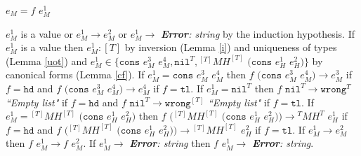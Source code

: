 \begin{case}

$e_{M}=f$ $e_{M}^{1}$

$e_{M}^{1}$ is a value or $e_{M}^{1}\rightarrow e_{M}^{2}$ or $e_{M}^{1}\rightarrow$ \emph{\textbf{Error}: string} by the induction hypothesis.  If $e_{M}^{1}$ is a value then $e_{M}^{1}:[T]$ by inversion (Lemma \ref{i}) and uniqueness of types (Lemma \ref{uot}) and $e_{M}^{1}\in\lbrace\mathtt{cons}$ $e_{M}^{3}$ $e_{M}^{4},\mathtt{nil}^{T},{^{[T]}M}H^{[T]}$ $(\mathtt{cons}$ $e_{H}^{1}$ $e_{H}^{2})\rbrace$ by canonical forms (Lemma \ref{cf}).  If $e_{M}^{1}=\mathtt{cons}$ $e_{M}^{3}$ $e_{M}^{4}$ then $f$ $(\mathtt{cons}$ $e_{M}^{3}$ $e_{M}^{4})\rightarrow e_{M}^{3}$ if $f=\mathtt{hd}$ and $f$ $(\mathtt{cons}$ $e_{M}^{3}$ $e_{M}^{4})\rightarrow e_{M}^{4}$ if $f=\mathtt{tl}$.  If $e_{M}^{1}=\mathtt{nil}^{T}$ then $f$ $\mathtt{nil}^{T}\rightarrow\mathtt{wrong}^{T}$ \emph{``Empty list"} if $f=\mathtt{hd}$ and $f$ $\mathtt{nil}^{T}\rightarrow\mathtt{wrong}^{[T]}$ \emph{``Empty list"} if $f=\mathtt{tl}$.  If $e_{M}^{1}={^{[T]}M}H^{[T]}$ $(\mathtt{cons}$ $e_{H}^{1}$ $e_{H}^{2})$ then $f$ $({^{[T]}M}H^{[T]}$ $(\mathtt{cons}$ $e_{H}^{1}$ $e_{H}^{2}))\rightarrow{^{T}M}H^{T}$ $e_{H}^{1}$ if $f=\mathtt{hd}$ and $f$ $({^{[T]}M}H^{[T]}$ $(\mathtt{cons}$ $e_{H}^{1}$ $e_{H}^{2}))\rightarrow{^{[T]}M}H^{[T]}$ $e_{H}^{2}$ if $f=\mathtt{tl}$.  If $e_{M}^{1}\rightarrow e_{M}^{2}$ then $f$ $e_{M}^{1}\rightarrow f$ $e_{M}^{2}$.  If $e_{M}^{1}\rightarrow$ \emph{\textbf{Error}: string} then $f$ $e_{M}^{1}\rightarrow$ \emph{\textbf{Error}: string}.

\end{case}